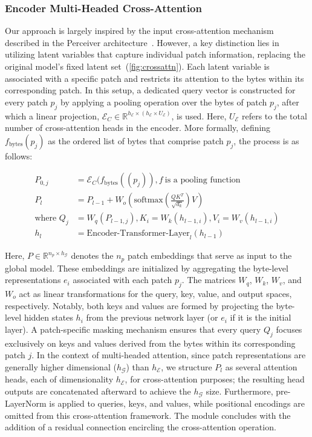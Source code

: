 \subsubsection{Encoder Multi-Headed Cross-Attention}
\label{sec:enc-cross-attn}
Our approach is largely inspired by the input cross-attention mechanism described in the Perceiver architecture~\citep{jaegle2021perceiver}. However, a key distinction lies in utilizing latent variables that capture individual patch information, replacing the original model's fixed latent set~(\autoref{fig:crossattn}). Each latent variable is associated with a specific patch and restricts its attention to the bytes within its corresponding patch. In this setup, a dedicated query vector is constructed for every patch $p_j$ by applying a pooling operation over the bytes of patch $p_j$, after which a linear projection, $\mathcal{E}_{C} \in \mathbb{R}^{h_{\mathcal{E}} \times (h_{\mathcal{E}} \times U_{\mathcal{E}})}$, is used. Here, $U_{\mathcal{E}}$ refers to the total number of cross-attention heads in the encoder. More formally, defining $f_{\text{bytes}}(p_j)$ as the ordered list of bytes that comprise patch $p_j$, the process is as follows:

\begin{align}
P_{0,j} &= \mathcal{E}_{C}(f_\text{bytes}((p_j)), f~ \text{is a pooling function} \\
P_l &= P_{l-1} + W_o\left(\text{softmax}\left(\frac{QK^T}{\sqrt{d_k}}\right)V\right) \\
\text{where } Q_j &= W_q(P_{l-1,j}), K_i = W_k(h_{l-1,i}), V_i = W_v(h_{l-1,i}) \\
h_l &= \text{Encoder-Transformer-Layer}_l(h_{l-1})
\end{align}

Here, $P \in \mathbb{R}^{n_p \times h_{\mathcal{G}}}$ denotes the $n_p$ patch embeddings that serve as input to the global model. These embeddings are initialized by aggregating the byte-level representations $e_i$ associated with each patch $p_j$. The matrices $W_q$, $W_k$, $W_v$, and $W_o$ act as linear transformations for the query, key, value, and output spaces, respectively. Notably, both keys and values are formed by projecting the byte-level hidden states $h_i$ from the previous network layer (or $e_i$ if it is the initial layer). A patch-specific masking mechanism ensures that every query $Q_j$ focuses exclusively on keys and values derived from the bytes within its corresponding patch $j$. In the context of multi-headed attention, since patch representations are generally higher dimensional ($h_{\mathcal{G}}$) than $h_{\mathcal{E}}$, we structure $P_l$ as several attention heads, each of dimensionality $h_{\mathcal{E}}$, for cross-attention purposes; the resulting head outputs are concatenated afterward to achieve the $h_{\mathcal{G}}$ size. Furthermore, pre-LayerNorm is applied to queries, keys, and values, while positional encodings are omitted from this cross-attention framework. The module concludes with the addition of a residual connection encircling the cross-attention operation.

